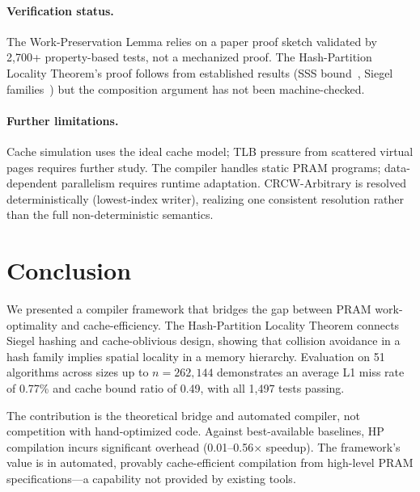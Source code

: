 \documentclass[11pt]{article}
\begin{document}
\paragraph{Verification status.}
The Work-Preservation Lemma relies on a paper proof sketch validated by
2,700+ property-based tests, not a mechanized proof.  The Hash-Partition
Locality Theorem's proof follows from established results (SSS
bound~\cite{schmidt1995chernoff}, Siegel families~\cite{siegel2004universal})
but the composition argument has not been machine-checked.

\paragraph{Further limitations.}
Cache simulation uses the ideal cache model; TLB pressure from scattered
virtual pages requires further study.  The compiler handles static PRAM
programs; data-dependent parallelism requires runtime adaptation.
CRCW-Arbitrary is resolved deterministically (lowest-index writer),
realizing one consistent resolution rather than the full non-deterministic
semantics.

\section{Conclusion}
\label{sec:conclusion}

We presented a compiler framework that bridges the gap between PRAM
work-optimality and cache-efficiency.  The Hash-Partition Locality
Theorem connects Siegel hashing and cache-oblivious design, showing
that collision avoidance in a hash family implies spatial locality in a
memory hierarchy.  Evaluation on 51 algorithms across sizes up to
$n = 262{,}144$ demonstrates an average L1 miss rate of 0.77\% and
cache bound ratio of 0.49, with all 1,497 tests passing.

The contribution is the theoretical bridge and automated compiler, not
competition with hand-optimized code.  Against best-available baselines,
HP compilation incurs significant overhead (0.01--0.56$\times$ speedup).
The framework's value is in automated, provably cache-efficient
compilation from high-level PRAM specifications---a capability not
provided by existing tools.
\end{document}
